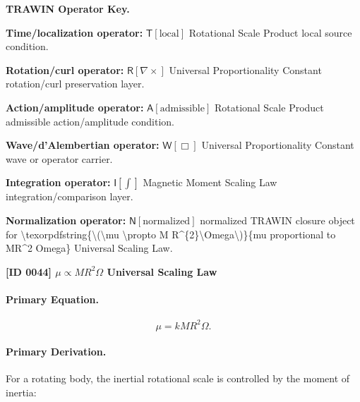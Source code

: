 \par\vspace{0.45\baselineskip}
\noindent\begin{minipage}[t]{\linewidth}
\begingroup
\small
\raggedright
\textbf{TRAWIN Operator Key.}\par
\noindent\textbf{Time/localization operator:} $\mathsf{T}\!\left[\mathrm{local}\right]$ Rotational Scale Product local source condition.\par
\noindent\textbf{Rotation/curl operator:} $\mathsf{R}\!\left[\nabla\times\right]$ Universal Proportionality Constant rotation/curl preservation layer.\par
\noindent\textbf{Action/amplitude operator:} $\mathsf{A}\!\left[\mathrm{admissible}\right]$ Rotational Scale Product admissible action/amplitude condition.\par
\noindent\textbf{Wave/d'Alembertian operator:} $\mathsf{W}\!\left[\Box\right]$ Universal Proportionality Constant wave or operator carrier.\par
\noindent\textbf{Integration operator:} $\mathsf{I}\!\left[\int\right]$ Magnetic Moment Scaling Law integration/comparison layer.\par
\noindent\textbf{Normalization operator:} $\mathsf{N}\!\left[\mathrm{normalized}\right]$ normalized TRAWIN closure object for \textbackslash{}texorpdfstring\{\textbackslash{}(\textbackslash{}mu \textbackslash{}propto M R\textasciicircum{}\{2\}\textbackslash{}Omega\textbackslash{})\}\{mu proportional to MR\textasciicircum{}2 Omega\} Universal Scaling Law.\par
\endgroup
\end{minipage}

\clearpage
\noindent\textbf{[ID 0044] \texorpdfstring{\(\mu \propto M R^{2}\Omega\)}{mu proportional to MR^2 Omega} Universal Scaling Law}\par
\vspace{0.35em}
\paragraph{Primary Equation.}
\begin{equation}
\mu
=
kMR^2\Omega .
\end{equation}

\paragraph{Primary Derivation.}
For a rotating body, the inertial rotational scale is controlled by the moment of inertia:

